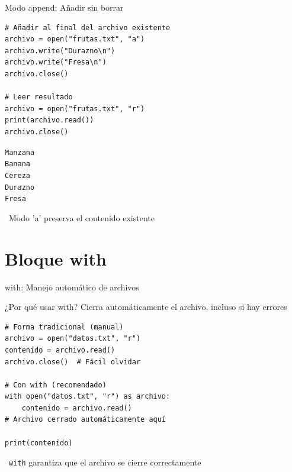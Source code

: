 \documentclass{beamer}
\begin{document}
\begin{frame}[fragile]{Modo append: Añadir sin borrar \faPlus}
\begin{lstlisting}
# Añadir al final del archivo existente
archivo = open("frutas.txt", "a")
archivo.write("Durazno\n")
archivo.write("Fresa\n")
archivo.close()

# Leer resultado
archivo = open("frutas.txt", "r")
print(archivo.read())
archivo.close()
\end{lstlisting}

\vspace{-0.2cm}
\begin{tcolorbox}[colback=green!10,colframe=green,title={\small\faArrowCircleRight \ Salida},coltitle=fg0,left=3pt,right=3pt,top=2pt,bottom=2pt,boxsep=1pt]
\small\texttt{Manzana\\
Banana\\
Cereza\\
Durazno\\
Fresa}
\end{tcolorbox}

\vspace{-0.1cm}
\begin{notebox}
\small\faCheckCircle\ Modo 'a' preserva el contenido existente
\end{notebox}
\end{frame}

\section{Bloque with}

\begin{frame}[fragile]{with: Manejo automático de archivos \faShieldAlt}
\begin{conceptbox}{¿Por qué usar with?}
Cierra automáticamente el archivo, incluso si hay errores
\end{conceptbox}

\begin{lstlisting}
# Forma tradicional (manual)
archivo = open("datos.txt", "r")
contenido = archivo.read()
archivo.close()  # Fácil olvidar

# Con with (recomendado)
with open("datos.txt", "r") as archivo:
    contenido = archivo.read()
# Archivo cerrado automáticamente aquí

print(contenido)
\end{lstlisting}

\vspace{-0.1cm}
\begin{notebox}
\small\faCheckCircle\ \texttt{with} garantiza que el archivo se cierre correctamente
\end{notebox}
\end{frame}
\end{document}

